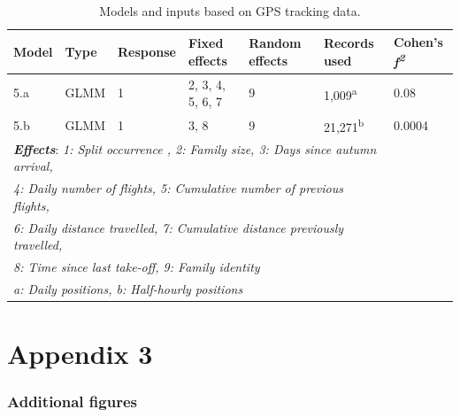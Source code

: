 \documentclass[10pt,twocolumn]{paper}
\begin{document}
\begin{table}[H]
\begin{tabular}{l*6l}
\toprule
Model & Type & Response & Fixed effects & Random effects & Records used & Cohen's \emph{f\textsuperscript{2}}\\
\midrule
5.a & GLMM & 1 & 2, 3, 4, 5, 6, 7 & 9 & 1,009\textsuperscript{a} & 0.08 \\

5.b & GLMM & 1 & 3, 8 & 9 & 21,271\textsuperscript{b} & 0.0004\\
\midrule
\multicolumn{6}{l}{\textbf{\emph{Effects}}: \emph{1: Split occurrence , 2: Family size, 3: Days since autumn arrival,}}\\
\multicolumn{6}{l}{\emph{4: Daily number of flights, 5: Cumulative number of previous flights,}}\\
\multicolumn{6}{l}{\emph{6: Daily distance travelled, 7: Cumulative distance previously travelled,}}\\
\multicolumn{6}{l}{\emph{8: Time since last take-off, 9: Family identity}}\\
\midrule
\multicolumn{6}{l}{\emph{a: Daily positions, b: Half-hourly positions}}\\
\bottomrule
\end{tabular}

\caption{Models and inputs based on GPS tracking data.}

\end{table}

\clearpage

\section{Appendix 3}\label{appendix-3}

\subsubsection{Additional figures}\label{additional-figures}
\end{document}
